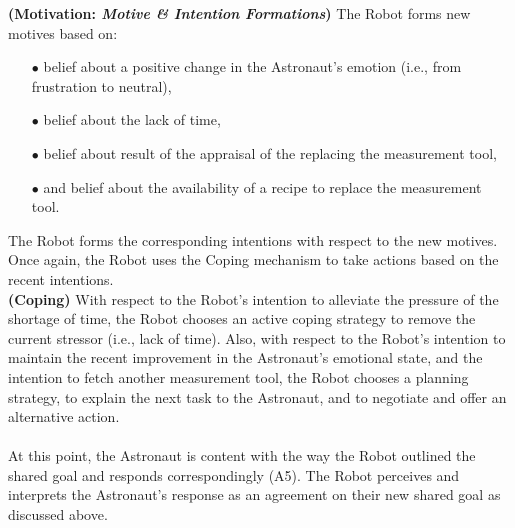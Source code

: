 \noindent\textbf{(Motivation: \textit{Motive \& Intention Formations})} The
Robot forms new motives based on:

\begin{itemize}
  \item[$\bullet$] belief about a positive change in the Astronaut's emotion
  (i.e., from frustration to neutral),
  \item[$\bullet$] belief about the lack of time,
  \item[$\bullet$] belief about result of the appraisal of the replacing the
  measurement tool,
  \item[$\bullet$] and belief about the availability of a recipe to replace the
  measurement tool.
\end{itemize}

\noindent The Robot forms the corresponding intentions with respect to the new
motives. Once again, the Robot uses the Coping mechanism to take actions
based on the recent intentions.\\

\noindent\textbf{(Coping)} With respect to the Robot's intention to alleviate
the pressure of the shortage of time, the Robot chooses an active coping
strategy to remove the current stressor (i.e., lack of time). Also, with respect
to the Robot's intention to maintain the recent improvement in the Astronaut's
emotional state, and the intention to fetch another measurement tool, the Robot
chooses a planning strategy, to explain the next task to the Astronaut, and to
negotiate and offer an alternative action.\\

\noindent{}\\

At this point, the Astronaut is content with the way the Robot outlined the
shared goal and responds correspondingly (A5). The Robot perceives and
interprets the Astronaut's response as an agreement on their new shared goal as
discussed above.\\

\noindent{}

